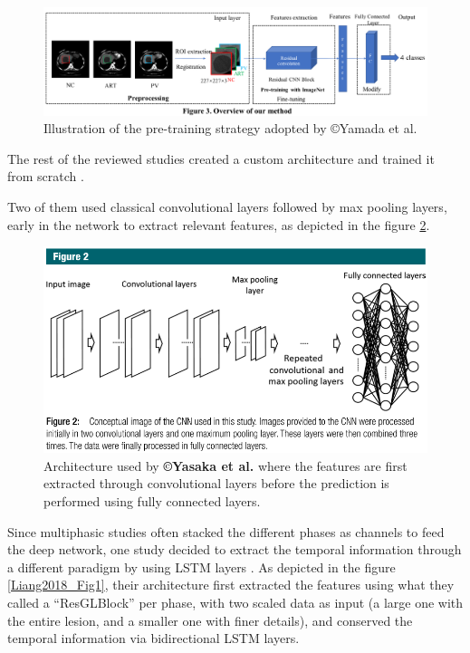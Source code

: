 \documentclass[]{article}
\begin{document}
\begin{figure}[th!]
\centering
\includegraphics[width=0.9\linewidth]{images/image6}
\caption{Illustration of the pre-training strategy adopted by ©Yamada et al. \cite{Yamada2019}}
\label{Yamada2019_Fig3}
\end{figure}


The rest of the reviewed studies created a custom architecture and
trained it from scratch \cite{Yasaka2018a,Yasaka2018,Liang2018}.

Two of them used classical convolutional layers followed by max pooling
layers, early in the network to extract relevant features, as depicted
in the figure \ref{Yasaka2018_Fig2}.

\begin{figure}[th!]
\centering
\includegraphics[width=0.7\linewidth]{images/image10}
\caption{Architecture used by \textbf{©Yasaka et al.} where the features are first extracted through convolutional layers before the prediction is performed using fully connected layers. \cite{Yasaka2018}}
\label{Yasaka2018_Fig2}
\end{figure}

Since multiphasic studies often stacked the different phases as channels
to feed the deep network, one study decided to extract the temporal
information through a different paradigm by using LSTM layers \cite{Liang2018}. As depicted
in the figure \ref{Liang2018_Fig1}, their architecture first extracted the features using what they
called a ``ResGLBlock'' per phase, with two scaled data as input (a
large one with the entire lesion, and a smaller one with finer details),
and conserved the temporal information via bidirectional LSTM
layers.
\end{document}
